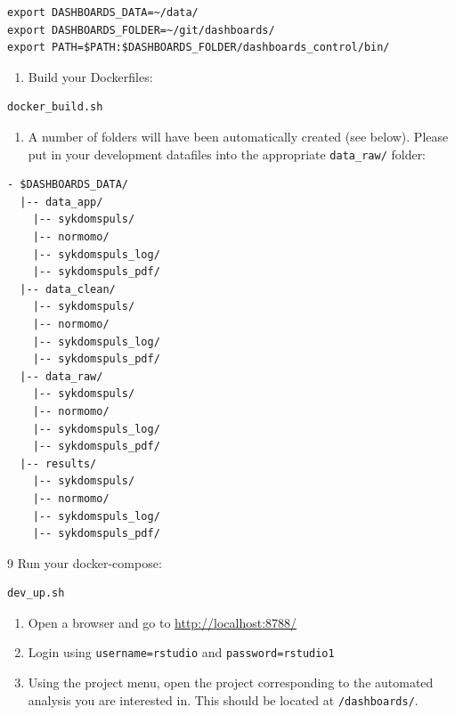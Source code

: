 \documentclass[12pt,]{article}
\providecommand{\tightlist}{%
  \setlength{\itemsep}{0pt}\setlength{\parskip}{0pt}}
\begin{document}
\begin{verbatim}
export DASHBOARDS_DATA=~/data/
export DASHBOARDS_FOLDER=~/git/dashboards/
export PATH=$PATH:$DASHBOARDS_FOLDER/dashboards_control/bin/
\end{verbatim}

\begin{enumerate}
\def\labelenumi{\arabic{enumi}.}
\setcounter{enumi}{6}
\tightlist
\item
  Build your Dockerfiles:
\end{enumerate}

\begin{verbatim}
docker_build.sh
\end{verbatim}

\begin{enumerate}
\def\labelenumi{\arabic{enumi}.}
\setcounter{enumi}{7}
\tightlist
\item
  A number of folders will have been automatically created (see below).
  Please put in your development datafiles into the appropriate
  \texttt{data\_raw/} folder:
\end{enumerate}

\begin{verbatim}
- $DASHBOARDS_DATA/
  |-- data_app/
    |-- sykdomspuls/
    |-- normomo/
    |-- sykdomspuls_log/
    |-- sykdomspuls_pdf/
  |-- data_clean/
    |-- sykdomspuls/
    |-- normomo/
    |-- sykdomspuls_log/
    |-- sykdomspuls_pdf/
  |-- data_raw/
    |-- sykdomspuls/
    |-- normomo/
    |-- sykdomspuls_log/
    |-- sykdomspuls_pdf/
  |-- results/
    |-- sykdomspuls/
    |-- normomo/
    |-- sykdomspuls_log/
    |-- sykdomspuls_pdf/
\end{verbatim}

9 Run your docker-compose:

\begin{verbatim}
dev_up.sh
\end{verbatim}

\begin{enumerate}
\def\labelenumi{\arabic{enumi}.}
\setcounter{enumi}{9}
\tightlist
\item
  Open a browser and go to \url{http://localhost:8788/}
\item
  Login using \texttt{username=rstudio} and \texttt{password=rstudio1}
\item
  Using the project menu, open the project corresponding to the
  automated analysis you are interested in. This should be located at
  \texttt{/dashboards/}.
\end{enumerate}
\end{document}
